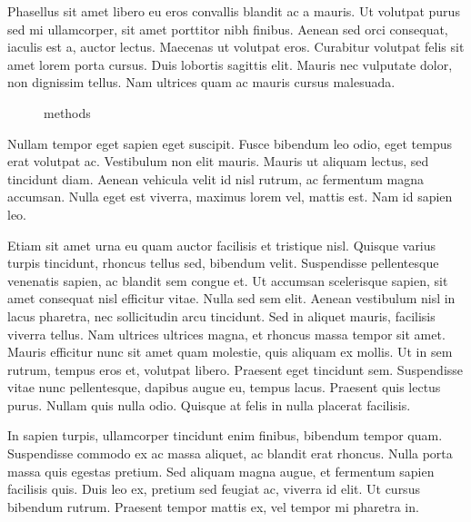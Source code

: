 \documentclass[a4paper]{article}
\begin{document}
Phasellus sit amet libero eu eros convallis blandit ac a mauris. Ut volutpat purus sed mi ullamcorper, sit amet porttitor nibh finibus. Aenean sed orci consequat, iaculis est a, auctor lectus. Maecenas ut volutpat eros. Curabitur volutpat felis sit amet lorem porta cursus. Duis lobortis sagittis elit. Mauris nec vulputate dolor, non dignissim tellus. Nam ultrices quam ac mauris cursus malesuada.
\begin{figure}[ht]
    \begin{center}
      \scalebox{0.75}{}
    \end{center}
    \caption{methods}
\end{figure}

Nullam tempor eget sapien eget suscipit. Fusce bibendum leo odio, eget tempus erat volutpat ac. Vestibulum non elit mauris. Mauris ut aliquam lectus, sed tincidunt diam. Aenean vehicula velit id nisl rutrum, ac fermentum magna accumsan. Nulla eget est viverra, maximus lorem vel, mattis est. Nam id sapien leo.

Etiam sit amet urna eu quam auctor facilisis et tristique nisl. Quisque varius turpis tincidunt, rhoncus tellus sed, bibendum velit. Suspendisse pellentesque venenatis sapien, ac blandit sem congue et. Ut accumsan scelerisque sapien, sit amet consequat nisl efficitur vitae. Nulla sed sem elit. Aenean vestibulum nisl in lacus pharetra, nec sollicitudin arcu tincidunt. Sed in aliquet mauris, facilisis viverra tellus. Nam ultrices ultrices magna, et rhoncus massa tempor sit amet. Mauris efficitur nunc sit amet quam molestie, quis aliquam ex mollis. Ut in sem rutrum, tempus eros et, volutpat libero. Praesent eget tincidunt sem. Suspendisse vitae nunc pellentesque, dapibus augue eu, tempus lacus. Praesent quis lectus purus. Nullam quis nulla odio. Quisque at felis in nulla placerat facilisis.

In sapien turpis, ullamcorper tincidunt enim finibus, bibendum tempor quam. Suspendisse commodo ex ac massa aliquet, ac blandit erat rhoncus. Nulla porta massa quis egestas pretium. Sed aliquam magna augue, et fermentum sapien facilisis quis. Duis leo ex, pretium sed feugiat ac, viverra id elit. Ut cursus bibendum rutrum. Praesent tempor mattis ex, vel tempor mi pharetra in.



\end{document}
